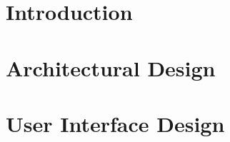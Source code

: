 \documentclass{util/polimi_3i}
\begin{document}
    \setcounter{page}{2}
    
    \newpage

\thispagestyle{empty}
\tableofcontents %
\thispagestyle{empty}
\cleardoublepage%

%
%
%    
%

\mainmatter%

\clearpage

\chapter{Introduction}\label{sect:introduction}


\clearpage
\chapter{Architectural Design}\label{sect:architectural design}


\clearpage
\chapter{User Interface Design}\label{sect:user interface design}

\end{document}
